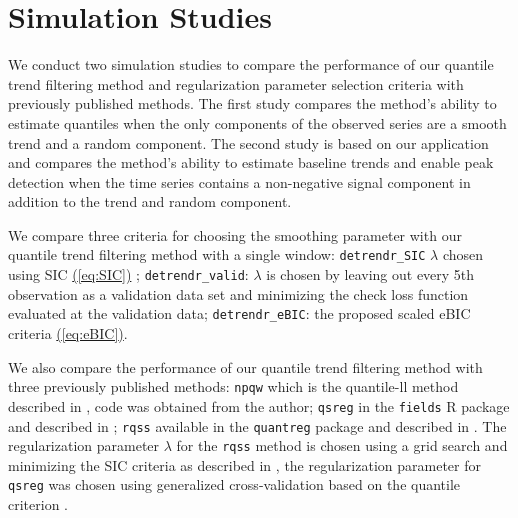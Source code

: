 \documentclass[12pt]{article}
\newcommand{\Eqn}[1]{\hyperref[eq:#1]{{\rm (\ref*{eq:#1})}}} %
\newcommand{\Eqn}[1]{{(\ref{eq:#1})}} %
\begin{document}
\section{Simulation Studies}
\label{sec:simluation}

	We conduct two simulation studies to compare the performance of our quantile trend filtering method and regularization parameter selection criteria with previously published methods. The first study compares the method's ability to estimate quantiles when the only components of the observed series are a smooth trend and a random component. The second study is based on our application and compares the method's ability to estimate baseline trends and enable peak detection when the time series contains a non-negative signal component in addition to the trend and random component. 
	
	We compare three criteria for choosing the smoothing parameter with our quantile trend filtering method with a single window: \texttt{detrendr\_SIC} $\lambda$ chosen using SIC \Eqn{SIC} \citep{KoenkerNgPortnoy1994}; \texttt{detrendr\_valid}: $\lambda$ is chosen by leaving out every 5th observation as a validation data set and minimizing the check loss function evaluated at the validation data; \texttt{detrendr\_eBIC}:  the proposed scaled eBIC criteria \Eqn{eBIC}.
	
	We also compare the performance of our quantile trend filtering method with three previously published methods: \texttt{npqw} which is the quantile-ll method described in \cite{Racine2017}, code was obtained from the author; \texttt{qsreg} in the \texttt{fields} R package and described in \cite{Oh2011, nychka1995nonparametric}; \texttt{rqss} available in the \texttt{quantreg} package and described in \cite{KoenkerNgPortnoy1994}.  The regularization parameter $\lambda$ for the \texttt{rqss} method is chosen using a grid search and minimizing the SIC criteria as described in \cite{KoenkerNgPortnoy1994}, the regularization parameter for \texttt{qsreg} was chosen using generalized cross-validation based on the quantile criterion \cite{Oh2011}. 
	
\end{document}
